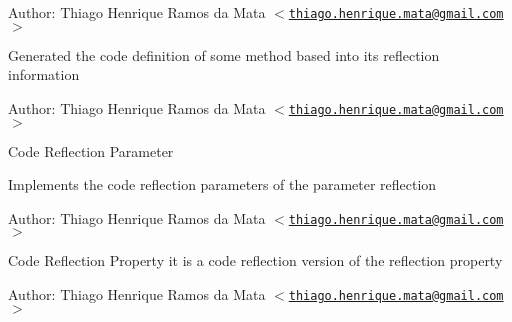 \begin{Desc}
\item[Author:]Thiago Henrique Ramos da Mata $<$\href{mailto:thiago.henrique.mata@gmail.com}{\tt thiago.henrique.mata@gmail.com}$>$\end{Desc}
Generated the code definition of some method based into its reflection information

\begin{Desc}
\item[Author:]Thiago Henrique Ramos da Mata $<$\href{mailto:thiago.henrique.mata@gmail.com}{\tt thiago.henrique.mata@gmail.com}$>$\end{Desc}
Code Reflection Parameter

Implements the code reflection parameters of the parameter reflection

\begin{Desc}
\item[Author:]Thiago Henrique Ramos da Mata $<$\href{mailto:thiago.henrique.mata@gmail.com}{\tt thiago.henrique.mata@gmail.com}$>$\end{Desc}
Code Reflection Property it is a code reflection version of the reflection property

\begin{Desc}
\item[Author:]Thiago Henrique Ramos da Mata $<$\href{mailto:thiago.henrique.mata@gmail.com}{\tt thiago.henrique.mata@gmail.com}$>$ \end{Desc}


